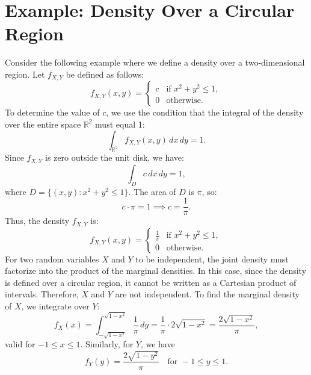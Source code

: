 \section{Example: Density Over a Circular Region}
Consider the following example where we define a density over a two-dimensional region. \newline
Let \( f_{X,Y} \) be defined as follows:
\[
f_{X,Y}(x, y) = \begin{cases}
c & \text{if } x^2 + y^2 \leq 1, \\
0 & \text{otherwise}.
\end{cases}
\]
To determine the value of \( c \), we use the condition that the integral of the density over the entire space \( \mathbb{R}^2 \) must equal 1:
\[
\int_{\mathbb{R}^2} f_{X,Y}(x, y) \, dx \, dy = 1.
\]
Since \( f_{X,Y} \) is zero outside the unit disk, we have:
\[
\int_{D} c \, dx \, dy = 1,
\]
where \( D = \{ (x, y) : x^2 + y^2 \leq 1 \} \). The area of \( D \) is \( \pi \), so:
\[
c \cdot \pi = 1 \implies c = \frac{1}{\pi}.
\]
Thus, the density \( f_{X,Y} \) is:
\[
f_{X,Y}(x, y) = \begin{cases}
\frac{1}{\pi} & \text{if } x^2 + y^2 \leq 1, \\
0 & \text{otherwise}.
\end{cases}
\]
For two random variables \( X \) and \( Y \) to be independent, the joint density must factorize into the product of the marginal densities. In this case, since the density is defined over a circular region, it cannot be written as a Cartesian product of intervals. Therefore, \( X \) and \( Y \) are not independent. \newline
To find the marginal density of \(X\), we integrate over \(Y\):
\[
f_X(x) = \int_{-\sqrt{1 - x^2}}^{\sqrt{1 - x^2}} \frac{1}{\pi} \, dy = \frac{1}{\pi} \cdot 2 \sqrt{1 - x^2} = \frac{2 \sqrt{1 - x^2}}{\pi},
\]
valid for \( -1 \leq x \leq 1 \). \newline
Similarly, for \(Y\), we have
\[
f_Y(y) = \frac{2 \sqrt{1 - y^2}}{\pi} \quad \text{for } -1 \leq y \leq 1.
\]






